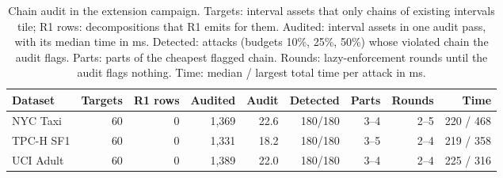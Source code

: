 \begin{table}[h]
\centering
\caption{Chain audit in the extension campaign. Targets: interval assets that only chains of existing intervals tile; R1 rows: decompositions that R1 emits for them. Audited: interval assets in one audit pass, with its median time in ms. Detected: attacks (budgets 10\%, 25\%, 50\%) whose violated chain the audit flags. Parts: parts of the cheapest flagged chain. Rounds: lazy-enforcement rounds until the audit flags nothing. Time: median / largest total time per attack in ms.}
\label{tab:ext-chains}
\footnotesize
\setlength{\tabcolsep}{3pt}
\begin{tabular}{@{}lrrrrrrrr@{}}
\toprule
Dataset & Targets & R1 rows & Audited & Audit & Detected & Parts & Rounds & Time \\
\midrule
NYC Taxi & 60 & 0 & 1{,}369 & 22.6 & 180/180 & 3--4 & 2--5 & 220 / 468 \\
TPC-H SF1 & 60 & 0 & 1{,}331 & 18.2 & 180/180 & 3--5 & 2--4 & 219 / 358 \\
UCI Adult & 60 & 0 & 1{,}389 & 22.0 & 180/180 & 3--4 & 2--4 & 225 / 316 \\
\bottomrule
\end{tabular}
\end{table}
